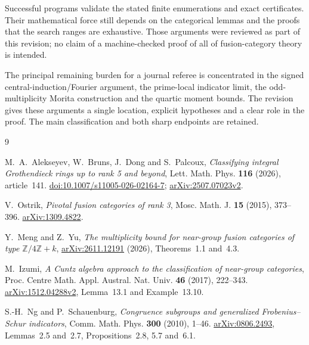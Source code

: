 \documentclass[11pt,a4paper]{article}
\begin{document}
Successful programs validate the stated finite enumerations and exact
certificates. Their mathematical force still depends on the categorical
lemmas and the proofs that the search ranges are exhaustive. Those
arguments were reviewed as part of this revision; no claim of a
machine-checked proof of all of fusion-category theory is intended.

The principal remaining burden for a journal referee is concentrated
in the signed central-induction/Fourier argument, the prime-local
indicator limit, the odd-multiplicity Morita construction and the
quartic moment bounds. The revision gives these arguments a single
location, explicit hypotheses and a clear role in the proof. The main
classification and both sharp endpoints are retained.

\begin{thebibliography}{9}
\raggedright
{}
M.~A.~Alekseyev, W.~Bruns, J.~Dong and S.~Palcoux,
\emph{Classifying integral Grothendieck rings up to rank 5 and beyond},
Lett. Math. Phys. \textbf{116} (2026), article~141.
\href{https://doi.org/10.1007/s11005-026-02164-7}{doi:10.1007/s11005-026-02164-7};
\href{https://arxiv.org/abs/2507.07023v2}{arXiv:2507.07023v2}.

V.~Ostrik, \emph{Pivotal fusion categories of rank 3},
Mosc. Math. J. \textbf{15} (2015), 373--396.
\href{https://arxiv.org/abs/1309.4822}{arXiv:1309.4822}.

Y.~Meng and Z.~Yu, \emph{The multiplicity bound for near-group fusion
categories of type \(\mathbb Z/4\mathbb Z+k\)},
\href{https://arxiv.org/abs/2611.12191}{arXiv:2611.12191} (2026),
Theorems~1.1 and~4.3.

M.~Izumi, \emph{A Cuntz algebra approach to the classification of
near-group categories}, Proc. Centre Math. Appl. Austral. Nat. Univ.
\textbf{46} (2017), 222--343.
\href{https://arxiv.org/abs/1512.04288v2}{arXiv:1512.04288v2},
Lemma~13.1 and Example~13.10.

S.-H.~Ng and P.~Schauenburg, \emph{Congruence subgroups and generalized
Frobenius--Schur indicators}, Comm. Math. Phys. \textbf{300} (2010),
1--46. \href{https://arxiv.org/abs/0806.2493}{arXiv:0806.2493},
Lemmas~2.5 and~2.7, Propositions~2.8, 5.7 and~6.1.
\end{thebibliography}
\end{document}
